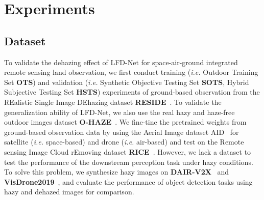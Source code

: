 \documentclass[lettersize,journal]{IEEEtran}
\begin{document}
\section{Experiments}
\subsection{Dataset}
To validate the dehazing effect of LFD-Net for space-air-ground integrated remote sensing land observation, we first conduct training (\textit{i.e.} Outdoor Training Set \textbf{OTS}) and validation (\textit{i.e.} Synthetic Objective Testing Set \textbf{SOTS}, Hybrid Subjective Testing Set \textbf{HSTS}) experiments of ground-based observation from the REalistic Single Image DEhazing dataset \textbf{RESIDE}~\cite{li2018reside}. To validate the generalization ability of LFD-Net, we also use the real hazy and haze-free outdoor images dataset \textbf{O-HAZE}~\cite{ancuti2018ohaze}. We fine-tine the pretrained weights from ground-based observation data by using the Aerial Image dataset AID~\cite{xia2017aid} for satellite (\textit{i.e.} space-based) and drone (\textit{i.e.} air-based) and test on the Remote sensing Image Cloud rEmoving dataset \textbf{RICE}~\cite{lin2019rice}. However, we lack a dataset to test the performance of the downstream perception task under hazy conditions. To solve this problem, 
we synthesize hazy images on \textbf{DAIR-V2X}~\cite{yu2022dair} and \textbf{VisDrone2019}~\cite{du2019visdrone}, and evaluate the performance of object detection tasks using hazy and dehazed images for comparison.


\end{document}
